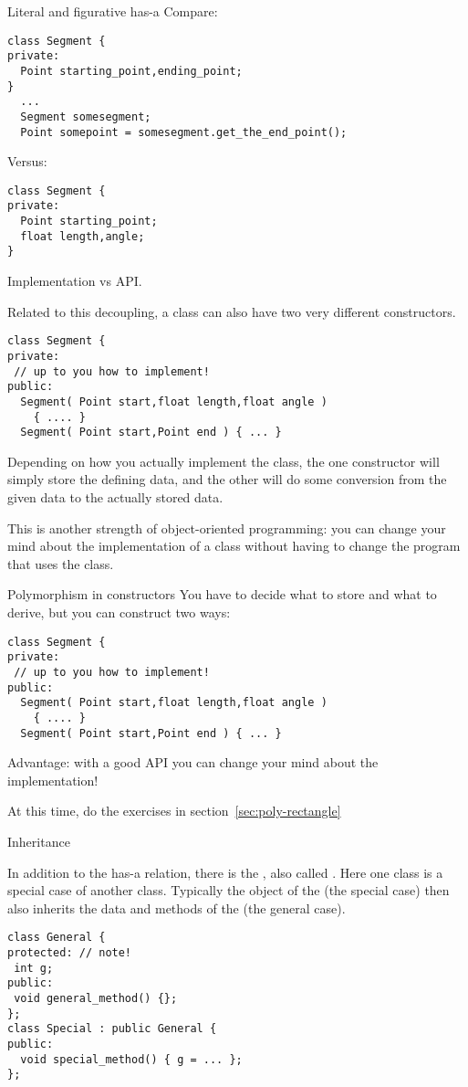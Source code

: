 \begin{slide}{Literal and figurative has-a}
  \label{sl:obj-hasa-ish}
\small
Compare:
\begin{verbatim}
class Segment {
private:
  Point starting_point,ending_point;
}
  ...
  Segment somesegment;
  Point somepoint = somesegment.get_the_end_point();
\end{verbatim}
  Versus:
\begin{verbatim}
class Segment {
private:
  Point starting_point;
  float length,angle;
}
\end{verbatim}
Implementation vs API.
\end{slide}

Related to this decoupling, a class can also have two very different constructors.
\begin{verbatim}
class Segment {
private:
 // up to you how to implement!
public:
  Segment( Point start,float length,float angle )
    { .... }
  Segment( Point start,Point end ) { ... }
\end{verbatim}
Depending on how you actually implement the class, the one constructor
will simply store the defining data, and the other will do some
conversion from the given data to the actually stored data.

This is another strength of object-oriented programming: you can
change your mind about the implementation of a class without having
to change the program that uses the class.

\begin{slide}{Polymorphism in constructors}
  \label{sl:obj-poly-construct}
  You have to decide what to store and what to derive, but you can
  construct two ways:
\begin{verbatim}
class Segment {
private:
 // up to you how to implement!
public:
  Segment( Point start,float length,float angle )
    { .... }
  Segment( Point start,Point end ) { ... }
\end{verbatim}
Advantage: with a good API you can change your mind about the implementation!
\end{slide}

At this time, do the exercises in section~\ref{sec:poly-rectangle}

 {Inheritance}
\label{sec:inheritance}

In addition to the has-a relation, there is the , also called . Here one class is
a special case of another class.
Typically the object of the  (the special
case) then also inherits the data and methods of the
 (the general case).
\begin{verbatim}
class General {
protected: // note!
 int g;
public:
 void general_method() {};
};
class Special : public General {
public:
  void special_method() { g = ... };
};
\end{verbatim}

